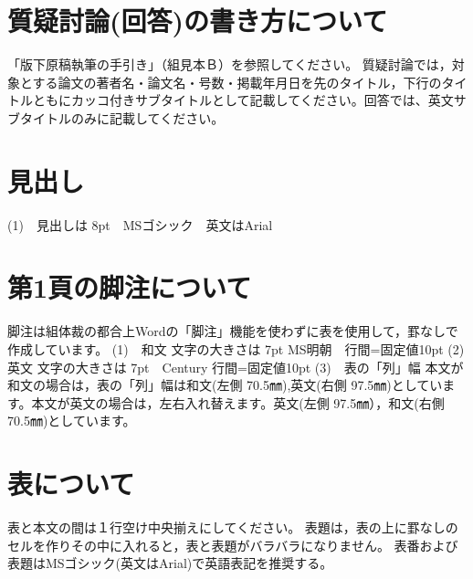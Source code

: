 \documentclass[base=8.8pt,magstyle=real,a4paper,twocolumn,xelatex,pandoc,jafont=ms]{bxjsarticle}
\begin{document}
\section{質疑討論(回答)の書き方について}
「版下原稿執筆の手引き」（組見本Ｂ）を参照してください。
質疑討論では，対象とする論文の著者名・論文名・号数・掲載年月日を先のタイトル，下行のタイトルともにカッコ付きサブタイトルとして記載してください。回答では、英文サブタイトルのみに記載してください。

\section{見出し}
(1)　見出しは 8pt　MSゴシック　英文はArial

\section{第1頁の脚注について}
脚注は組体裁の都合上Wordの「脚注」機能を使わずに表を使用して，罫なしで作成しています。
(1)　和文
文字の大きさは 7pt  MS明朝　行間=固定値10pt
(2)　英文
文字の大きさは 7pt　Century  行間=固定値10pt
(3)　表の「列」幅
本文が和文の場合は，表の「列」幅は和文(左側 70.5㎜),英文(右側 97.5㎜)としています。本文が英文の場合は，左右入れ替えます。英文(左側 97.5㎜），和文(右側 70.5㎜)としています。

\section{表について}
表と本文の間は１行空け中央揃えにしてください。
表題は，表の上に罫なしのセルを作りその中に入れると，表と表題がバラバラになりません。
表番および表題はMSゴシック(英文はArial)で英語表記を推奨する。
\end{document}
